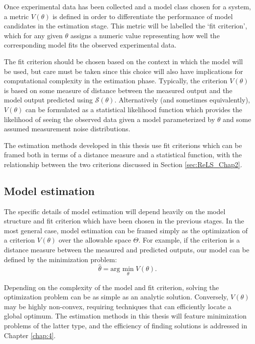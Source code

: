 Once experimental data has been collected and a model class chosen for a system, a metric $V(\theta)$ is defined in order to differentiate the performance of model candidates in the estimation stage. This metric will be labelled the `fit criterion', which for any given $\theta$ assigns a numeric value representing how well the corresponding model fits the observed experimental data. 

The fit criterion should be chosen based on the context in which the model will be used, but care must be taken since this choice will also have implications for computational complexity in the estimation phase. Typically, the criterion $V(\theta)$ is based on some measure of distance between the measured output and the model output predicted using $\mathcal{S}(\theta)$. Alternatively (and sometimes equivalently), $V(\theta)$ can be formulated as a statistical likelihood function which provides the likelihood of seeing the observed data given a model parameterized by $\theta$ and some assumed measurement noise distributions. 

The estimation methods developed in this thesis use fit criterions which can be framed both in terms of a distance measure and a statistical function, with the relationship between the two criterions discussed in Section \ref{sec:ReLS_Chap2}.

\subsection{Model estimation}

The specific details of model estimation will depend heavily on the model structure and fit criterion which have been chosen in the previous stages. In the most general case, model estimation can be framed simply as the optimization of a criterion $V(\theta)$ over the allowable space $\Theta$. For example, if the criterion is a distance measure between the measured and predicted outputs, our model can be defined by the minimization problem:
\begin{equation}
\hat{\theta} = \text{arg } \underset{\theta}{\text{min}} \; V(\theta).
\end{equation}

Depending on the complexity of the model and fit criterion, solving the optimization problem can be as simple as an analytic solution. Conversely, $V(\theta)$ may be highly non-convex, requiring techniques that can efficiently locate a global optimum. The estimation methods in this thesis will feature minimization problems of the latter type, and the efficiency of finding solutions is addressed in Chapter \ref{chap:4}.

